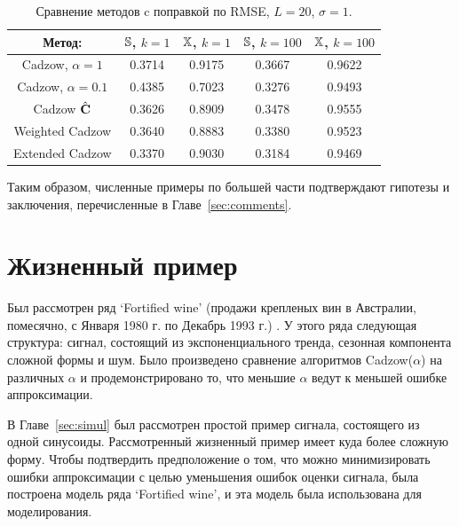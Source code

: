 \documentclass[12pt, specialist, subf,href,colorlinks=true,substylefile = spbu.rtx]{disser}
\theoremstyle{remark}
\theoremstyle{definition}
\begin{document}
\begin{table}[!hhh]
	\begin{center}
		\caption{Сравнение методов c поправкой по RMSE, $L = 20$, $\sigma=1$.}\label{fintable_improved}
		\begin{tabular}{|c|c|c|c|c|}
			\hline
			Метод: & $\mathbb{S}$, $k = 1$ & $\mathbb{X}$, $k = 1$ & $\mathbb{S}$, $k = 100$ & $\mathbb{X}$, $k = 100$  \\
			\hline
			Cadzow, $\alpha = 1$ & 0.3714 & 0.9175 & 0.3667 & 0.9622 \\
			\hline
			Cadzow, $\alpha = 0.1$ & 0.4385 & 0.7023 & 0.3276 & 0.9493 \\
			\hline
			Cadzow $\hat{\mathbf{C}}$ & 0.3626 & 0.8909 & 0.3478 & 0.9555 \\
			\hline
			Weighted Cadzow & 0.3640 & 0.8883 & 0.3380 & 0.9523 \\
			\hline
			Extended Cadzow & 0.3370 & 0.9030 & 0.3184 & 0.9469 \\
			\hline
		\end{tabular}
	\end{center}
\end{table}

Таким образом, численные примеры по большей части подтверждают гипотезы и заключения, перечисленные в Главе~\ref{sec:comments}.

\section{Жизненный пример}
\label{sec:ex_real}
Был рассмотрен ряд `Fortified wine' (продажи крепленых вин в Австралии, помесячно, с Января 1980 г. по Декабрь 1993 г.) \citep{HyndmanTSDL}. У этого ряда следующая структура: сигнал, состоящий из экспоненциального тренда, сезонная компонента сложной формы и шум.
Было произведено сравнение алгоритмов Cadzow($\alpha$) на различных $\alpha$ и продемонстрировано то, что меньшие $\alpha$ ведут к меньшей ошибке аппроксимации.

В Главе~\ref{sec:simul} был рассмотрен простой пример сигнала, состоящего из одной синусоиды.
Рассмотренный жизненный пример имеет куда более сложную форму. Чтобы подтвердить предположение о том, что можно минимизировать ошибки аппроксимации с целью уменьшения ошибок оценки сигнала,
была построена модель ряда `Fortified wine', и эта модель была использована для моделирования.
\end{document}
